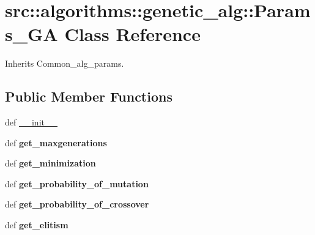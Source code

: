 \hypertarget{classsrc_1_1algorithms_1_1genetic__alg_1_1Params__GA}{
\section{src::algorithms::genetic\_\-alg::Params\_\-GA Class Reference}
\label{classsrc_1_1algorithms_1_1genetic__alg_1_1Params__GA}
}


Inherits Common\_\-alg\_\-params.

\subsection*{Public Member Functions}
\begin{DoxyCompactItemize}
\item 
def \hyperlink{classsrc_1_1algorithms_1_1genetic__alg_1_1Params__GA_a87da62f905026bf8cc8686920e564ca1}{\_\-\_\-init\_\-\_\-}
\item 
\hypertarget{classsrc_1_1algorithms_1_1genetic__alg_1_1Params__GA_ac59fd6055153de19cc9a73fdab274ca1}{
def {\bfseries get\_\-maxgenerations}}
\label{classsrc_1_1algorithms_1_1genetic__alg_1_1Params__GA_ac59fd6055153de19cc9a73fdab274ca1}

\item 
\hypertarget{classsrc_1_1algorithms_1_1genetic__alg_1_1Params__GA_ab6c3ca6bb0811984033d2769da43cc48}{
def {\bfseries get\_\-minimization}}
\label{classsrc_1_1algorithms_1_1genetic__alg_1_1Params__GA_ab6c3ca6bb0811984033d2769da43cc48}

\item 
\hypertarget{classsrc_1_1algorithms_1_1genetic__alg_1_1Params__GA_a9c563c88eaae09ab31b3efa5217fd127}{
def {\bfseries get\_\-probability\_\-of\_\-mutation}}
\label{classsrc_1_1algorithms_1_1genetic__alg_1_1Params__GA_a9c563c88eaae09ab31b3efa5217fd127}

\item 
\hypertarget{classsrc_1_1algorithms_1_1genetic__alg_1_1Params__GA_ad77d5986fec27f410459c1a90035a514}{
def {\bfseries get\_\-probability\_\-of\_\-crossover}}
\label{classsrc_1_1algorithms_1_1genetic__alg_1_1Params__GA_ad77d5986fec27f410459c1a90035a514}

\item 
\hypertarget{classsrc_1_1algorithms_1_1genetic__alg_1_1Params__GA_a689f32b2ba9a3394721933216794704d}{
def {\bfseries get\_\-elitism}}
\label{classsrc_1_1algorithms_1_1genetic__alg_1_1Params__GA_a689f32b2ba9a3394721933216794704d}


\end{DoxyCompactItemize}
